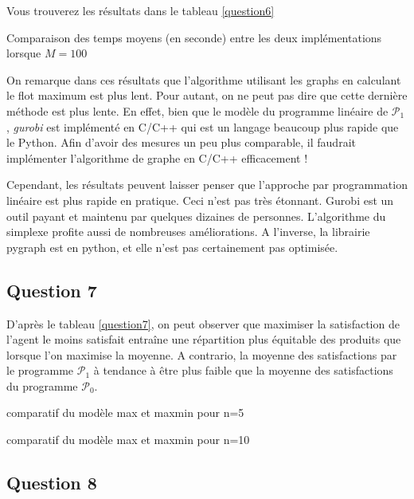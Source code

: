 \documentclass[a4paper, titlepage, oneside, 12pt]{article}%
\begin{document}
Vous trouverez les résultats dans le tableau \ref{question6}
\begin{table}
\begin{center}
\caption{Comparaison des temps moyens (en seconde) entre les deux implémentations lorsque $M=100$}
\label{question6}
\end{center}
\end{table}

On remarque dans ces résultats que l'algorithme utilisant les graphs en calculant le flot maximum est plus lent. Pour autant, on ne peut pas dire que cette dernière méthode est plus lente. En effet, bien que le modèle du programme linéaire de $\mathcal{P}_1$, \textit{gurobi} est implémenté en C/C++ qui est un langage beaucoup plus rapide que le Python. Afin d'avoir des mesures un peu plus comparable, il faudrait implémenter l'algorithme de graphe en C/C++ efficacement ! 

Cependant, les résultats peuvent laisser penser que l'approche par programmation linéaire est plus rapide en pratique. Ceci n'est pas très étonnant. Gurobi est un outil payant et maintenu par quelques dizaines de personnes. L'algorithme du simplexe profite aussi de nombreuses améliorations. A l'inverse, la librairie pygraph est en python, et elle n'est pas certainement pas optimisée.
\subsection{Question 7}

D'après le tableau \ref{question7}, on peut observer que maximiser la satisfaction de l'agent le moins satisfait entraîne une répartition plus équitable des produits que lorsque l'on maximise la moyenne. A contrario, la moyenne des satisfactions par le programme $\mathcal{P}_1$ à tendance à être plus faible que la moyenne des satisfactions du programme $\mathcal{P}_0$.


\begin{table}
\caption{comparatif du modèle max et maxmin pour n=5  }
\caption{comparatif du modèle max et maxmin pour n=10 }
\label{question7}
\end{table}


\subsection{Question 8}
\end{document}
